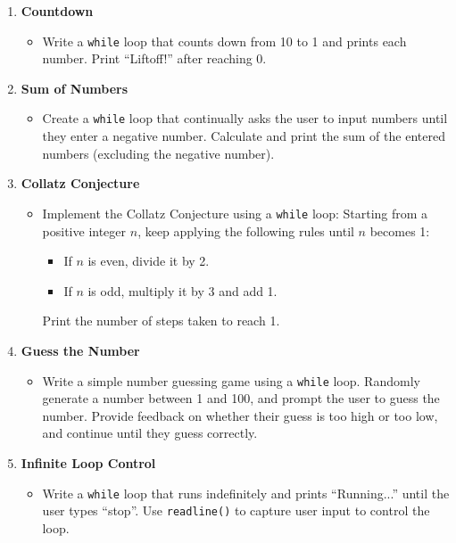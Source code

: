 \documentclass[10pt]{book}
\begin{document}
\begin{enumerate}
    \item \textbf{Countdown}
    \begin{itemize}
        \item Write a \texttt{while} loop that counts down from 10 to 1 and prints each number. Print ``Liftoff!'' after reaching 0.
    \end{itemize}

    \item \textbf{Sum of Numbers}
    \begin{itemize}
        \item Create a \texttt{while} loop that continually asks the user to input numbers until they enter a negative number. Calculate and print the sum of the entered numbers (excluding the negative number).
    \end{itemize}

    \item \textbf{Collatz Conjecture}
    \begin{itemize}
        \item Implement the Collatz Conjecture using a \texttt{while} loop: Starting from a positive integer \( n \), keep applying the following rules until \( n \) becomes 1:
        \begin{itemize}
            \item If \( n \) is even, divide it by 2.
            \item If \( n \) is odd, multiply it by 3 and add 1.
        \end{itemize}
        Print the number of steps taken to reach 1.
    \end{itemize}

    \item \textbf{Guess the Number}
    \begin{itemize}
        \item Write a simple number guessing game using a \texttt{while} loop. Randomly generate a number between 1 and 100, and prompt the user to guess the number. Provide feedback on whether their guess is too high or too low, and continue until they guess correctly.
    \end{itemize}

    \item \textbf{Infinite Loop Control}
    \begin{itemize}
        \item Write a \texttt{while} loop that runs indefinitely and prints ``Running...'' until the user types ``stop''. Use \texttt{readline()} to capture user input to control the loop.
    \end{itemize}
\end{enumerate}
\end{document}
